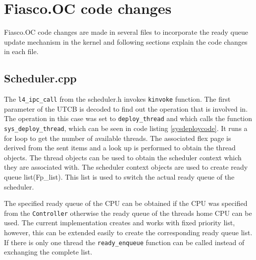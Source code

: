\section{Fiasco.OC code changes}
Fiasco.OC code changes are made in several files to incorporate the ready queue update mechanism in the kernel and following sections explain the code changes in each file.

\subsection{Scheduler.cpp}

The \texttt{l4\_ipc\_call} from the scheduler.h invokes \texttt{kinvoke} function. The first parameter of the UTCB is decoded to find out the operation that is involved in. The operation in this case was set to \texttt{deploy\_thread} and which calls the function \texttt{sys\_deploy\_thread}, which can be seen in code listing \ref{sysdeploycode}. It runs a for loop to get the number of available threads. The associated flex page is derived from the sent items and a look up is performed to obtain the thread objects. The thread objects can be used to obtain the scheduler context which they are associated with. The scheduler context objects are used to create ready queue list(Fp\_list). This list is used to switch the actual ready queue of the scheduler.

The specified ready queue of the CPU can be obtained if the CPU was specified from the \texttt{Controller} otherwise the ready queue of the threads home CPU can be used. The current implementation creates and works with fixed priority list, however, this can be extended easily to create the corresponding ready queue list. If there is only one thread the \texttt{ready\_enqueue} function can be called instead of exchanging the complete list.


